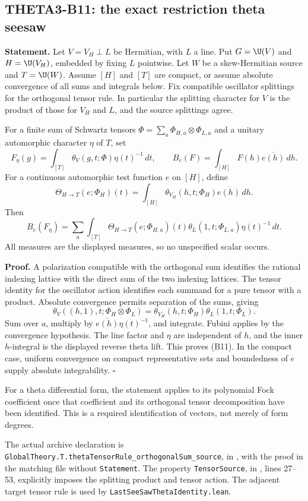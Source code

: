 \documentclass[11pt]{article}
\theoremstyle{definition}\newtheorem{definition}[theorem]{Definition}\newtheorem{remark}[theorem]{Remark}
\begin{document}
\subsection{THETA3-B11: the exact restriction theta seesaw}\label{B11}

\textbf{Statement.} Let $V=V_H\perp L$ be Hermitian, with $L$ a line. Put $G=\U(V)$ and $H=\U(V_H)$, embedded by fixing $L$ pointwise. Let $W$ be a skew-Hermitian source and $T=\U(W)$. Assume $[H]$ and $[T]$ are compact, or assume absolute convergence of all sums and integrals below. Fix compatible oscillator splittings for the orthogonal tensor rule. In particular the splitting character for $V$ is the product of those for $V_H$ and $L$, and the source splittings agree.

For a finite sum of Schwartz tensors
$\Phi=\sum_a\Phi_{H,a}\otimes\Phi_{L,a}$ and a unitary automorphic character $\eta$ of $T$, set
\[
 F_\eta(g)=\int_{[T]}\theta_V(g,t;\Phi)\eta(t)^{-1}\,dt,
 \qquad
 B_e(F)=\int_{[H]}F(h)\overline{e(h)}\,dh.
\]
For a continuous automorphic test function $e$ on $[H]$, define
\[
 \Theta_{H\to T}(e;\Phi_H)(t)=
 \int_{[H]}\theta_{V_H}(h,t;\Phi_H)\overline{e(h)}\,dh.
\]
Then
\[
 B_e(F_\eta)=\sum_a\int_{[T]}
 \Theta_{H\to T}(e;\Phi_{H,a})(t)
 \theta_L(1,t;\Phi_{L,a})\eta(t)^{-1}\,dt.
 \tag{B11}
\]
All measures are the displayed measures, so no unspecified scalar occurs.

\textbf{Proof.} A polarization compatible with the orthogonal sum identifies the rational indexing lattice with the direct sum of the two indexing lattices. The tensor identity for the oscillator action identifies each summand for a pure tensor with a product. Absolute convergence permits separation of the sums, giving
\[
 \theta_V((h,1),t;\Phi_H\otimes\Phi_L)
       =\theta_{V_H}(h,t;\Phi_H)\theta_L(1,t;\Phi_L).
\]
Sum over $a$, multiply by $\overline{e(h)}\eta(t)^{-1}$, and integrate. Fubini applies by the convergence hypothesis. The line factor and $\eta$ are independent of $h$, and the inner $h$-integral is the displayed reverse theta lift. This proves (B11). In the compact case, uniform convergence on compact representative sets and boundedness of $e$ supply absolute integrability. \hfill$\square$

For a theta differential form, the statement applies to its polynomial Fock coefficient once that coefficient and its orthogonal tensor decomposition have been identified. This is a required identification of vectors, not merely of form degrees.

The actual archive declaration is
\nolinkurl{GlobalTheory.T.thetaTensorRule_orthogonalSum_source}, in
, with the proof in the matching file without \texttt{Statement}. The property \texttt{TensorSource}, in , lines 27--53, explicitly imposes the splitting product and tensor action. The adjacent target tensor rule is used by \nolinkurl{LastSeeSawThetaIdentity.lean}.
\end{document}
